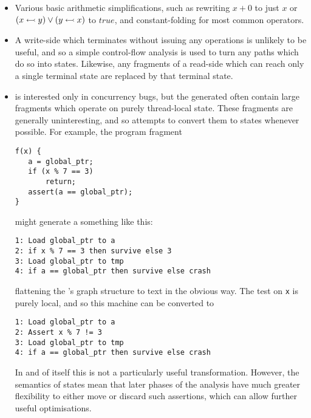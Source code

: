 \begin{itemize}
\item
  Various basic arithmetic simplifications, such as rewriting $x + 0$
  to just $x$ or $(x \leftarrowtail y) \vee (y \leftarrowtail x)$ to
  $true$, and constant-folding for most common operators.
\item
  A write-side {\StateMachine} which terminates without issuing any
   operations is unlikely to be useful, and so a simple
  control-flow analysis is used to turn any paths which do so into
   states.  Likewise, any fragments of a read-side
  {\StateMachine} which can reach only a single terminal state
  are replaced by that terminal state.
\item
  {\Technique} is interested only in concurrency bugs, but the
  {\StateMachines} generated often contain large fragments which
  operate on purely thread-local state.  These fragments are generally
  uninteresting, and so {\technique} attempts to convert them to
   states whenever possible.  For example, the program
  fragment

\begin{verbatim}
f(x) {
   a = global_ptr;
   if (x % 7 == 3)
       return;
   assert(a == global_ptr);
}
\end{verbatim}

   might generate a {\StateMachine} something like this:

\begin{verbatim}
1: Load global_ptr to a
2: if x % 7 == 3 then survive else 3
3: Load global_ptr to tmp
4: if a == global_ptr then survive else crash
\end{verbatim}

   flattening the {\StateMachine}'s graph structure to text in the
   obvious way.  The test on \verb|x| is purely local, and so this
   machine can be converted to

\begin{verbatim}
1: Load global_ptr to a
2: Assert x % 7 != 3
3: Load global_ptr to tmp
4: if a == global_ptr then survive else crash
\end{verbatim}

   In and of itself this is not a particularly useful transformation.
   However, the semantics of  states mean that later
   phases of the analysis have much greater flexibility to either move
   or discard such assertions, which can allow further useful
   optimisations.  
\end{itemize}

